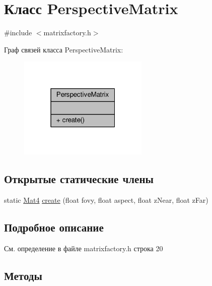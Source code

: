 \hypertarget{class_perspective_matrix}{}\section{Класс Perspective\+Matrix}
\label{class_perspective_matrix}


{\ttfamily \#include $<$matrixfactory.\+h$>$}



Граф связей класса Perspective\+Matrix\+:
\nopagebreak
\begin{figure}[H]
\begin{center}
\leavevmode
\includegraphics[width=175pt]{d1/df5/class_perspective_matrix__coll__graph}
\end{center}
\end{figure}
\subsection*{Открытые статические члены}
\begin{DoxyCompactItemize}
\item 
static \hyperlink{matrix_8h_a077dce9756976f552e5703c34475d5e3}{Mat4} \hyperlink{class_perspective_matrix_a624dcd9fb919a67e66d5aa7ecf22f3cd}{create} (float fovy, float aspect, float z\+Near, float z\+Far)
\end{DoxyCompactItemize}


\subsection{Подробное описание}


См. определение в файле matrixfactory.\+h строка 20



\subsection{Методы}
